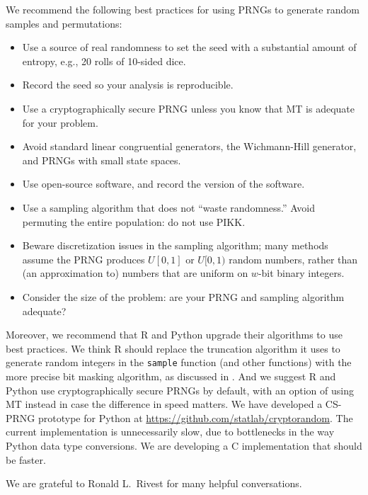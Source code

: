\documentclass[graybox]{svmult}
\begin{document}
We recommend the following best practices for using PRNGs to generate random samples and permutations:
\begin{itemize}
\item Use a source of real randomness to set the seed with a substantial amount of entropy, e.g., 20 rolls of 10-sided dice.
\item Record the seed so your analysis is reproducible.
\item Use a cryptographically secure PRNG unless you know that MT is adequate for your problem.
\item Avoid standard linear congruential generators, the Wichmann-Hill generator, and PRNGs with small state spaces.
\item Use open-source software, and record the version of the software.
\item Use a sampling algorithm that does not ``waste randomness.'' Avoid permuting the entire population: do not use PIKK.
\item Beware discretization issues in the sampling algorithm; many methods assume the PRNG produces $U[0,1]$ or $U[0,1)$ random numbers, rather than (an approximation to) numbers that are uniform on $w$-bit binary integers.
\item Consider the size of the problem: are your PRNG and sampling algorithm adequate?
\end{itemize}


Moreover, we recommend that R and Python upgrade their algorithms to use best practices.
We think R should replace the truncation algorithm it uses to generate random integers in the \texttt{sample} function (and other functions) with the more precise bit masking algorithm, as discussed
in \cite{ottoboniStark18}.
And we suggest R and Python use cryptographically secure PRNGs by default, with an option of using MT instead in case the difference in speed matters.
We have developed a CS-PRNG prototype for Python at \url{https://github.com/statlab/cryptorandom}.
The current implementation is unnecessarily slow, due to bottlenecks in the way Python data type
conversions. 
We are developing a C implementation that should be faster.



\begin{acknowledgement}
We are grateful to Ronald L.~Rivest for many helpful conversations.
\end{acknowledgement}




\end{document}
